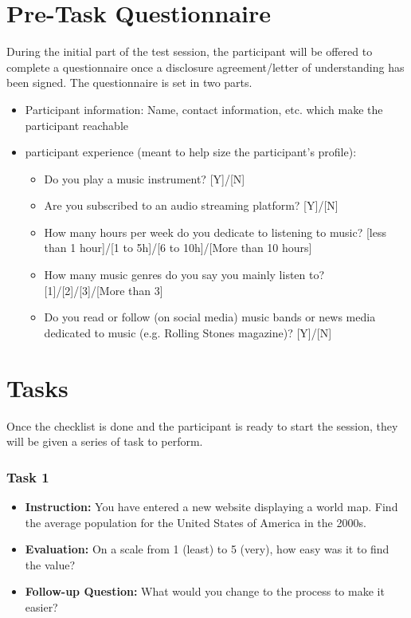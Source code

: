 \documentclass[twocolumn, letterpaper,13pt]{scrartcl}
\begin{document}
    \section*{Pre-Task Questionnaire}
    
    During the initial part of the test session, the participant will be offered to complete a questionnaire once a disclosure agreement/letter of understanding has been signed. The questionnaire is set in two parts. 
    \begin{itemize}
        \item Participant information: Name, contact information, etc. which make the participant reachable
        \item participant experience (meant to help size the participant's profile):
        \begin{itemize}
            \item Do you play a music instrument? [Y]/[N]
            \item Are you subscribed to an audio streaming platform? [Y]/[N]
            \item How many hours per week do you dedicate to listening to music? [less than 1 hour]/[1 to 5h]/[6 to 10h]/[More than 10 hours]
            \item How many music genres do you say you mainly listen to? [1]/[2]/[3]/[More than 3]
            \item Do you read or follow (on social media) music bands or news media dedicated to music (e.g. Rolling Stones magazine)? [Y]/[N]
        \end{itemize}
    \end{itemize}
    
    \section*{Tasks}
    
    Once the checklist is done and the participant is ready to start the session, they will be given a series of task to perform.

    \subsubsection*{Task 1}
    \begin{itemize}
        \item \textbf{Instruction:} You have entered a new website displaying a world map. Find the average population for the United States of America in the 2000s.
        \item \textbf{Evaluation:} On a scale from 1 (least) to 5 (very), how easy was it to find the value?
        \item \textbf{Follow-up Question:} What would you change to the process to make it easier?
    \end{itemize}
    
\end{document}
